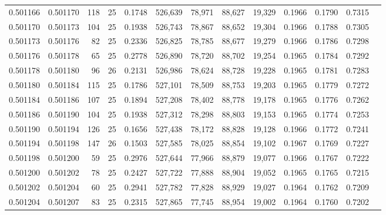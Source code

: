 \begin{tabular}{rrrrrrrrrrrrr}
0.501166 & 0.501170 & 118 &  25 &                                     0.1748 & 526,639 &  78,971 &  88,627 &  19,329 & 0.1966 & 0.1790 & 0.7315 \\
0.501170 & 0.501173 & 104 &  25 &                                     0.1938 & 526,743 &  78,867 &  88,652 &  19,304 & 0.1966 & 0.1788 & 0.7305 \\
0.501173 & 0.501176 &  82 &  25 &                                     0.2336 & 526,825 &  78,785 &  88,677 &  19,279 & 0.1966 & 0.1786 & 0.7298 \\
0.501176 & 0.501178 &  65 &  25 &                                     0.2778 & 526,890 &  78,720 &  88,702 &  19,254 & 0.1965 & 0.1784 & 0.7292 \\
0.501178 & 0.501180 &  96 &  26 &                                     0.2131 & 526,986 &  78,624 &  88,728 &  19,228 & 0.1965 & 0.1781 & 0.7283 \\
0.501180 & 0.501184 & 115 &  25 &                                     0.1786 & 527,101 &  78,509 &  88,753 &  19,203 & 0.1965 & 0.1779 & 0.7272 \\
0.501184 & 0.501186 & 107 &  25 &                                     0.1894 & 527,208 &  78,402 &  88,778 &  19,178 & 0.1965 & 0.1776 & 0.7262 \\
0.501186 & 0.501190 & 104 &  25 &                                     0.1938 & 527,312 &  78,298 &  88,803 &  19,153 & 0.1965 & 0.1774 & 0.7253 \\
0.501190 & 0.501194 & 126 &  25 &                                     0.1656 & 527,438 &  78,172 &  88,828 &  19,128 & 0.1966 & 0.1772 & 0.7241 \\
0.501194 & 0.501198 & 147 &  26 &                                     0.1503 & 527,585 &  78,025 &  88,854 &  19,102 & 0.1967 & 0.1769 & 0.7227 \\
0.501198 & 0.501200 &  59 &  25 &                                     0.2976 & 527,644 &  77,966 &  88,879 &  19,077 & 0.1966 & 0.1767 & 0.7222 \\
0.501200 & 0.501202 &  78 &  25 &                                     0.2427 & 527,722 &  77,888 &  88,904 &  19,052 & 0.1965 & 0.1765 & 0.7215 \\
0.501202 & 0.501204 &  60 &  25 &                                     0.2941 & 527,782 &  77,828 &  88,929 &  19,027 & 0.1964 & 0.1762 & 0.7209 \\
0.501204 & 0.501207 &  83 &  25 &                                     0.2315 & 527,865 &  77,745 &  88,954 &  19,002 & 0.1964 & 0.1760 & 0.7202 \\

\end{tabular}
